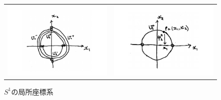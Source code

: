 \documentclass[twocolumn]{jarticle}
\theoremstyle{definition}
\begin{document}
\begin{figure}[H]
  \begin{tabular}{cc}
    \begin{minipage}[t]{0.45\hsize}
      \centering
      \includegraphics[keepaspectratio, scale=0.2]{localCoSysOfS1_1.pdf}
      \caption{$S^1$の開集合}
      \label{}
    \end{minipage} &
    \begin{minipage}[t]{0.45\hsize}
      \centering
      \includegraphics[keepaspectratio, scale=0.2]{localCoSysOfS1_2.pdf}
      \caption{$S^1$の局所座標系}
      \label{}
    \end{minipage}
  \end{tabular}
\end{figure}
\end{document}
